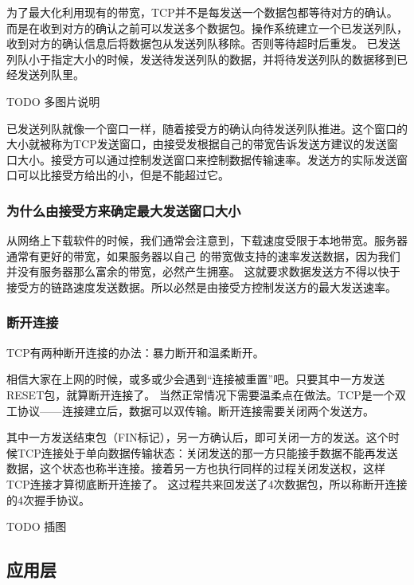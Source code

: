 为了最大化利用现有的带宽，TCP并不是每发送一个数据包都等待对方的确认。而是在收到对方的确认之前可以发送多个数据包。操作系统建立一个已发送列队，收到对方的确认信息后将数据包从发送列队移除。否则等待超时后重发。
已发送列队小于指定大小的时候，发送待发送列队的数据，并将待发送列队的数据移到已经发送列队里。

TODO 多图片说明 %

已发送列队就像一个窗口一样，随着接受方的确认向待发送列队推进。这个窗口的大小就被称为TCP发送窗口，由接受发根据自己的带宽告诉发送方建议的发送窗口大小。接受方可以通过控制发送窗口来控制数据传输速率。发送方的实际发送窗口可以比接受方给出的小，但是不能超过它。

\begin{insertnote}
\subsubsection*{为什么由接受方来确定最大发送窗口大小}
从网络上下载软件的时候，我们通常会注意到，下载速度受限于本地带宽。服务器通常有更好的带宽，如果服务器以自己
的带宽做支持的速率发送数据，因为我们并没有服务器那么富余的带宽，必然产生拥塞。
这就要求数据发送方不得以快于接受方的链路速度发送数据。所以必然是由接受方控制发送方的最大发送速率。

\end{insertnote}

\subsubsection{断开连接}

TCP有两种断开连接的办法：暴力断开和温柔断开。

相信大家在上网的时候，或多或少会遇到“连接被重置”吧。只要其中一方发送RESET包，就算断开连接了。
当然正常情况下需要温柔点在做法。TCP是一个双工协议——连接建立后，数据可以双传输。断开连接需要关闭两个发送方。

其中一方发送结束包（FIN标记），另一方确认后，即可关闭一方的发送。这个时候TCP连接处于单向数据传输状态：关闭发送的那一方只能接手数据不能再发送数据，这个状态也称半连接。接着另一方也执行同样的过程关闭发送权，这样TCP连接才算彻底断开连接了。
这过程共来回发送了4次数据包，所以称断开连接的4次握手协议。


TODO 插图


\subsection{应用层}


